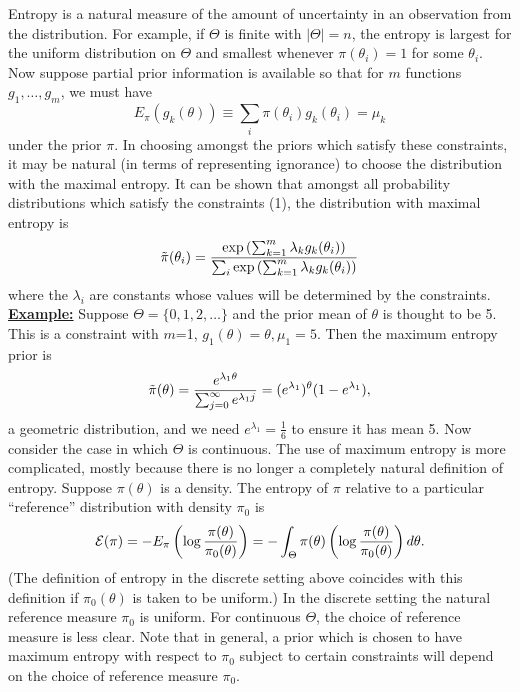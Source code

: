 \documentclass[12pt]{article}
\def\ni{\noindent}
\begin{document}
Entropy is a natural
measure of the amount of uncertainty in an observation from the
distribution.  For example, if $\Theta$ is finite with $|\Theta |=n$,
the entropy is largest for the uniform distribution on $\Theta$ and
smallest whenever $\pi(\theta_i)=1$ for some $\theta_i$.
\vskip 4mm
Now suppose partial prior information is available so that for $m$
functions $g_1,\ldots,g_m$, we must have
\begin{equation}
E_{\pi} (g_k(\theta))\equiv \sum_{i} \pi(\theta_i) g_k(\theta_i)=\mu_k
\end{equation}
under the prior $\pi$.  In choosing amongst the priors which satisfy
these constraints, it may be natural (in terms of representing
ignorance) to choose the distribution with the maximal entropy.  It
can be shown that amongst all probability distributions which satisfy
the constraints (1), the distribution with maximal entropy is
$$\tilde{\pi} (\theta_i)={\exp \left( \sum_{k=1}^m \lambda_k
    g_k(\theta_i) \right) \over \sum_i \exp \left( \sum_{k=1}^m \lambda_k
    g_k(\theta_i) \right)}$$
where the $\lambda_i$ are constants whose values will be determined by
the constraints.
\vskip 4mm
\ni\underline{\bf Example:}  Suppose $\Theta=\{0,1,2,\ldots\}$ and the
prior mean of $\theta$ is thought to be 5.  This is a constraint with
$m$=1, $g_1(\theta)=\theta,\mu_1=5$.  Then the maximum entropy prior is
$$\tilde{\pi} (\theta)={e^{\lambda_1 \theta} \over \sum_{j=0}^\infty
  e^{\lambda_1 j}} = (e^{\lambda_1})^\theta (1-e^{\lambda_1}),$$
a geometric distribution, and we need $e^{\lambda_1}=\frac{1}{6}$ to
ensure it has mean 5.
\vskip 6mm
Now consider the case in which $\Theta$ is continuous.  The use of
maximum entropy is more complicated, mostly because there is no
longer a completely natural definition of entropy.
\vskip 4mm
Suppose $\pi(\theta)$ is a density.  The entropy of $\pi$ relative to
a particular ``reference'' distribution with density $\pi_0$ is
$${\cal{E}}(\pi)=-E_{\pi} \left( \log\frac{\pi(\theta)}{\pi_0 (\theta)}
\right) = -\int_\Theta \pi(\theta)\left( \log\frac{\pi(\theta)}{\pi_0
    (\theta)} \right) d\theta.$$
(The definition of entropy in the discrete setting above
coincides with this definition if $\pi_0 (\theta)$ is taken to be
uniform.)
\vskip 4mm
In the discrete setting the natural reference measure $\pi_0$
is uniform.  For continuous $\Theta$, the choice of reference measure
is less clear.  Note that in general, a prior which is chosen to have
maximum entropy with respect to $\pi_0$ subject to certain
constraints will depend on the choice of reference measure 
$\pi_0$.
\end{document}
